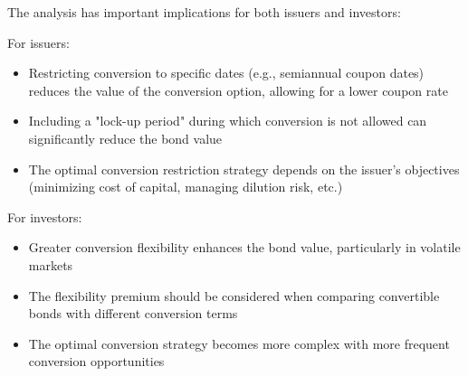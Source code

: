 The analysis has important implications for both issuers and investors:

For issuers:
\begin{itemize}
    \item Restricting conversion to specific dates (e.g., semiannual coupon dates) reduces the value of the conversion option, allowing for a lower coupon rate
    \item Including a "lock-up period" during which conversion is not allowed can significantly reduce the bond value
    \item The optimal conversion restriction strategy depends on the issuer's objectives (minimizing cost of capital, managing dilution risk, etc.)
\end{itemize}

For investors:
\begin{itemize}
    \item Greater conversion flexibility enhances the bond value, particularly in volatile markets
    \item The flexibility premium should be considered when comparing convertible bonds with different conversion terms
    \item The optimal conversion strategy becomes more complex with more frequent conversion opportunities
\end{itemize}

